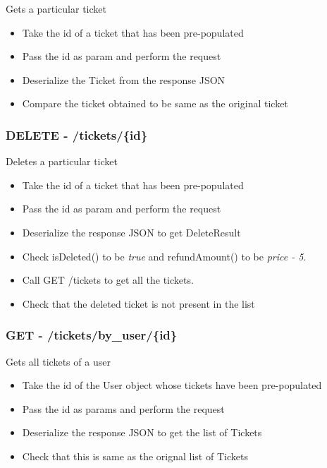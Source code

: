 \documentclass[]{article}
\providecommand{\tightlist}{%
  \setlength{\itemsep}{0pt}\setlength{\parskip}{0pt}}
\begin{document}
Gets a particular ticket

\begin{itemize}
\tightlist
\item
  Take the id of a ticket that has been pre-populated
\item
  Pass the id as param and perform the request
\item
  Deserialize the Ticket from the response JSON
\item
  Compare the ticket obtained to be same as the original ticket
\end{itemize}

\hypertarget{delete---ticketsid}{%
\subsubsection{DELETE - /tickets/\{id\}}\label{delete---ticketsid}}

Deletes a particular ticket

\begin{itemize}
\tightlist
\item
  Take the id of a ticket that has been pre-populated
\item
  Pass the id as param and perform the request
\item
  Deserialize the response JSON to get DeleteResult
\item
  Check isDeleted() to be \emph{true} and refundAmount() to be
  \emph{price - 5}.
\item
  Call GET /tickets to get all the tickets.
\item
  Check that the deleted ticket is not present in the list
\end{itemize}

\hypertarget{get---ticketsby_userid}{%
\subsubsection{GET -
/tickets/by\_user/\{id\}}\label{get---ticketsby_userid}}

Gets all tickets of a user

\begin{itemize}
\tightlist
\item
  Take the id of the User object whose tickets have been pre-populated
\item
  Pass the id as params and perform the request
\item
  Deserialize the response JSON to get the list of Tickets
\item
  Check that this is same as the orignal list of Tickets
\end{itemize}
\end{document}
